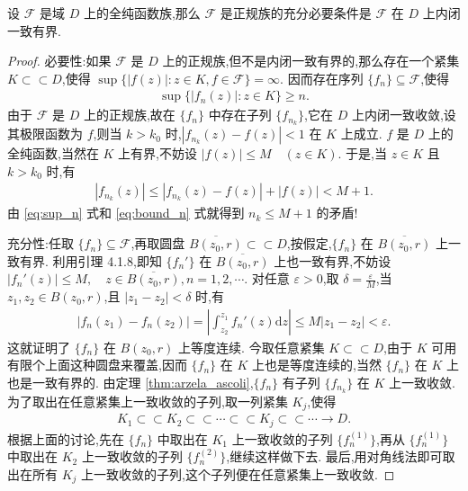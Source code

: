 \documentclass[../../main.tex]{subfiles}%
\begin{document}
\begin{theorem}[Montel定理]\label{theorem:复变-----Montel定理}
设 \(\mathscr{F}\) 是域 \(D\) 上的全纯函数族,那么 \(\mathscr{F}\) 是正规族的充分必要条件是 \(\mathscr{F}\) 在 \(D\) 上内闭一致有界.
\end{theorem}
\begin{proof}

{\heiti 必要性:}如果 \(\mathscr{F}\) 是 \(D\) 上的正规族,但不是内闭一致有界的,那么存在一个紧集 \(K \subset \subset D\),使得 \(\sup \{|f(z)|: z \in K, f \in \mathscr{F}\} = \infty.\) 因而存在序列 \(\{f_n\} \subseteq \mathscr{F}\),使得
\begin{align}
\sup \{|f_n(z)|: z \in K\} \geqslant n. \label{eq:sup_n}
\end{align}
由于 \(\mathscr{F}\) 是 \(D\) 上的正规族,故在 \(\{f_n\}\) 中存在子列 \(\{f_{n_k}\}\),它在 \(D\) 上内闭一致收敛,设其极限函数为 \(f\),则当 \(k > k_0\) 时,\(|f_{n_k}(z) - f(z)| < 1\) 在 \(K\) 上成立. \(f\) 是 \(D\) 上的全纯函数,当然在 \(K\) 上有界,不妨设 \(|f(z)| \leqslant M \quad (z \in K)\). 于是,当 \(z \in K\) 且 \(k > k_0\) 时,有
\begin{align}
|f_{n_k}(z)| \leqslant |f_{n_k}(z) - f(z)| + |f(z)| < M + 1. \label{eq:bound_n}
\end{align}
由 \eqref{eq:sup_n} 式和 \eqref{eq:bound_n} 式就得到 \(n_k \leqslant M + 1\) 的矛盾!

{\heiti 充分性:}任取 \(\{f_n\} \subseteq \mathscr{F}\),再取圆盘 \(\overline{B(z_0, r)} \subset \subset D\),按假定,\(\{f_n\}\) 在 \(\overline{B(z_0, r)}\) 上一致有界. 利用引理 4.1.8,即知 \(\{f_n'\}\) 在 \(\overline{B(z_0, r)}\) 上也一致有界,不妨设 \(|f_n'(z)| \leqslant M, \quad z \in \overline{B(z_0, r)}, n=1, 2, \cdots.\) 对任意 \(\varepsilon > 0\),取 \(\delta = \frac{\varepsilon}{M}\),当 \(z_1, z_2 \in B(z_0, r)\),且 \(|z_1 - z_2| < \delta\) 时,有
\begin{align*}
|f_n(z_1) - f_n(z_2)| = \left| \int_{z_2}^{z_1} f_n'(z) \mathrm{d}z \right| \leqslant M |z_1 - z_2| < \varepsilon.
\end{align*}
这就证明了 \(\{f_n\}\) 在 \(B(z_0, r)\) 上等度连续. 今取任意紧集 \(K \subset \subset D\),由于 \(K\) 可用有限个上面这种圆盘来覆盖,因而 \(\{f_n\}\) 在 \(K\) 上也是等度连续的,当然 \(\{f_n\}\) 在 \(K\) 上也是一致有界的. 由定理 \eqref{thm:arzela_ascoli},\(\{f_n\}\) 有子列 \(\{f_{n_k}\}\) 在 \(K\) 上一致收敛. 为了取出在任意紧集上一致收敛的子列,取一列紧集 \(K_j\),使得
\begin{align*}
K_1 \subset \subset K_2 \subset \subset \cdots \subset \subset K_j \subset \subset \cdots \to D.
\end{align*}
根据上面的讨论,先在 \(\{f_n\}\) 中取出在 \(K_1\) 上一致收敛的子列 \(\{f_n^{(1)}\}\),再从 \(\{f_n^{(1)}\}\) 中取出在 \(K_2\) 上一致收敛的子列 \(\{f_n^{(2)}\}\),继续这样做下去. 最后,用对角线法即可取出在所有 \(K_j\) 上一致收敛的子列,这个子列便在任意紧集上一致收敛.
\end{proof}
\end{document}
